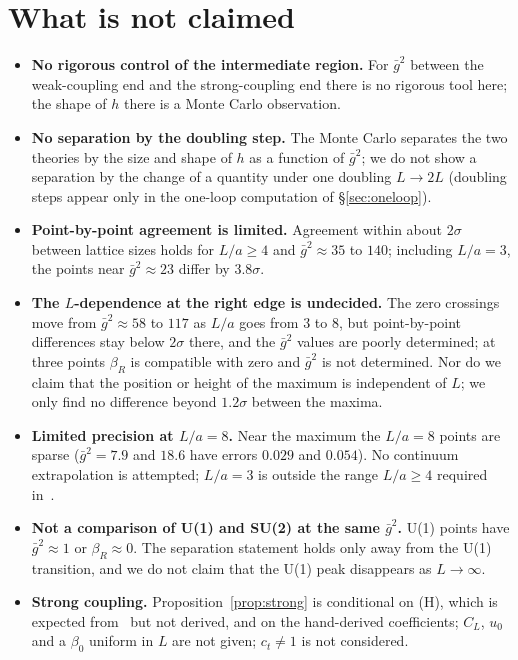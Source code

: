 \documentclass[11pt,a4paper]{article}
\theoremstyle{definition}
\theoremstyle{remark}
\newcommand{\gb}{\bar g^{2}}
\newcommand{\bR}{\beta_R}
\begin{document}
\section{What is not claimed}\label{sec:notclaimed}

\begin{itemize}[leftmargin=2em]
\item \textbf{No rigorous control of the intermediate region.} For $\gb$ between the weak-coupling end and the strong-coupling end there is no rigorous tool here; the shape of $h$ there is a Monte Carlo observation.
\item \textbf{No separation by the doubling step.} The Monte Carlo separates the two theories by the size and shape of $h$ as a function of $\gb$; we do not show a separation by the change of a quantity under one doubling $L\to2L$ (doubling steps appear only in the one-loop computation of \S\ref{sec:oneloop}).
\item \textbf{Point-by-point agreement is limited.} Agreement within about $2\sigma$ between lattice sizes holds for $L/a\ge4$ and $\gb\approx35$ to $140$; including $L/a=3$, the points near $\gb\approx23$ differ by $3.8\sigma$.
\item \textbf{The $L$-dependence at the right edge is undecided.} The zero crossings move from $\gb\approx58$ to $117$ as $L/a$ goes from $3$ to $8$, but point-by-point differences stay below $2\sigma$ there, and the $\gb$ values are poorly determined; at three points $\bR$ is compatible with zero and $\gb$ is not determined. Nor do we claim that the position or height of the maximum is independent of $L$; we only find no difference beyond $1.2\sigma$ between the maxima.
\item \textbf{Limited precision at $L/a=8$.} Near the maximum the $L/a=8$ points are sparse ($\gb=7.9$ and $18.6$ have errors $0.029$ and $0.054$). No continuum extrapolation is attempted; $L/a=3$ is outside the range $L/a\ge4$ required in~\cite{LNWW,LSWW}.
\item \textbf{Not a comparison of U(1) and SU(2) at the same $\gb$.} U(1) points have $\gb\approx1$ or $\bR\approx0$. The separation statement holds only away from the U(1) transition, and we do not claim that the U(1) peak disappears as $L\to\infty$.
\item \textbf{Strong coupling.} Proposition~\ref{prop:strong} is conditional on (H), which is expected from~\cite{OS} but not derived, and on the hand-derived coefficients; $C_L$, $u_0$ and a $\beta_0$ uniform in $L$ are not given; $c_t\ne1$ is not considered.

\end{itemize}
\end{document}
